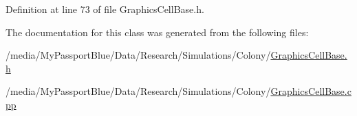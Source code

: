 \-Definition at line 73 of file \-Graphics\-Cell\-Base.\-h.



\-The documentation for this class was generated from the following files\-:\begin{DoxyCompactItemize}
\item 
/media/\-My\-Passport\-Blue/\-Data/\-Research/\-Simulations/\-Colony/\hyperlink{_graphics_cell_base_8h}{\-Graphics\-Cell\-Base.\-h}\item 
/media/\-My\-Passport\-Blue/\-Data/\-Research/\-Simulations/\-Colony/\hyperlink{_graphics_cell_base_8cpp}{\-Graphics\-Cell\-Base.\-cpp}\end{DoxyCompactItemize}
